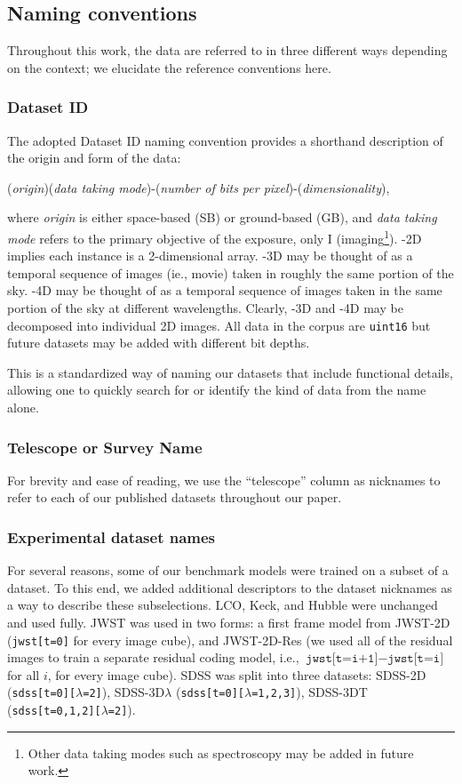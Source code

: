 \subsection{Naming conventions}

Throughout this work, the data are referred to in three different ways depending on the context; we elucidate the reference conventions here.

\subsubsection{Dataset ID}

The adopted Dataset ID naming convention provides a shorthand description of the origin and form of the data:
\begin{center}
({\it origin})({\it data taking mode})-({\it number of bits per pixel})-({\it dimensionality}),
\end{center}
where {\it origin} is either space-based (SB) or ground-based (GB), and {\it data taking mode} refers to the primary objective of the exposure, only I (imaging\footnote{Other data taking modes such as spectroscopy may be added in future work.}). -2D implies each instance is a 2-dimensional array.  -3D may be thought of as a temporal sequence of images (ie., movie) taken in roughly the same portion of the sky. -4D may be thought of as a temporal sequence of images taken in the same portion of the sky at different wavelengths. Clearly, -3D and -4D may be decomposed into individual 2D images. All data in the corpus are \texttt{uint16} but future datasets may be added with different bit depths.

This is a standardized way of naming our datasets that include functional details, allowing one to quickly search for or identify the kind of data from the name alone. 

\subsubsection{Telescope or Survey Name}

For brevity and ease of reading, we use the ``telescope'' column as nicknames to refer to each of our published datasets throughout our paper.

\subsubsection{Experimental dataset names}

For several reasons, some of our benchmark models were trained on a subset of a dataset. To this end, we added additional descriptors to the dataset nicknames as a way to describe these subselections. LCO, Keck, and Hubble were unchanged and used fully. JWST was used in two forms: a first frame model from JWST-2D (\texttt{jwst[t=0]} for every image cube), and JWST-2D-Res (we used all of the residual images to train a separate residual coding model, i.e., \(\texttt{jwst[t=i+1]} - \texttt{jwst[t=i]}\) for all \(i\), for every image cube). SDSS was split into three datasets: SDSS-2D (\texttt{sdss[t=0][$\lambda$=2]}), SDSS-3D$\lambda$ (\texttt{sdss[t=0][$\lambda$=1,2,3]}), SDSS-3DT (\texttt{sdss[t=0,1,2][$\lambda$=2]}).


